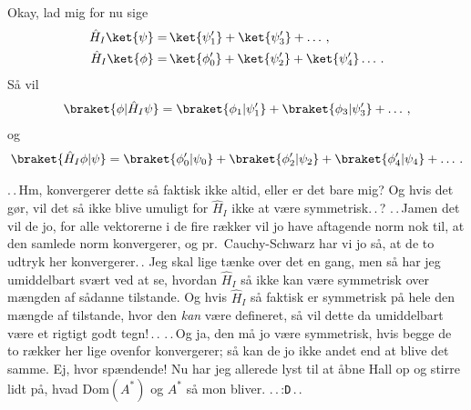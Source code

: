 \documentclass{report}
\begin{document}
Okay, lad mig for nu sige
\begin{align}
\begin{aligned}
	\hat H_I \ket{\psi} =&\, \ket{\psi_1'} + \ket{\psi_3'} + \ldots\,,\\
	\hat H_I \ket{\phi} =&\, \ket{\phi_0'} + \ket{\psi_2'} + \ket{\psi_4'} \ldots\,.
\end{aligned}
\end{align}
Så vil 
\begin{align}
\begin{aligned}
	\braket{\phi| \hat H_I \psi} = \braket{\phi_1| \psi_1'}  + \braket{\phi_3| \psi_3'} + \ldots\,, 
	\label{phi.hpsi}
\end{aligned}
\end{align}
og
\begin{align}
\begin{aligned}
	\braket{\hat H_I \phi| \psi} = \braket{\phi_0'| \psi_0}  + \braket{\phi_2'| \psi_2} + \braket{\phi_4'| \psi_4} + \ldots\,.
	\label{hphi.psi}
\end{aligned}
\end{align}

.\,.\,Hm, konvergerer dette så faktisk ikke altid, eller er det bare mig? Og hvis det gør, vil det så ikke blive umuligt for $\hat H_I$ ikke at være symmetrisk.\,.\,? .\,.\,Jamen det vil de jo, for alle vektorerne i de fire rækker vil jo have aftagende norm nok til, at den samlede norm konvergerer, og pr.\ Cauchy-Schwarz har vi jo så, at de to udtryk her konvergerer.\,. Jeg skal lige tænke over det en gang, men så har jeg umiddelbart svært ved at se, hvordan $\hat H_I$ så ikke kan være symmetrisk over mængden af sådanne tilstande. Og hvis $\hat H_I$ så faktisk er symmetrisk på hele den mængde af tilstande, hvor den \emph{kan} være defineret, så vil dette da umiddelbart være et rigtigt godt tegn!\,.\,. .\,.\,Og ja, den må jo være symmetrisk, hvis begge de to rækker her lige ovenfor konvergerer; så kan de jo ikke andet end at blive det samme. Ej, hvor spændende! Nu har jeg allerede lyst til at åbne Hall op og stirre lidt på, hvad Dom$(A^*)$ og $A^*$ så mon bliver. .\,.\,:\texttt D\,.\,. 
\end{document}
